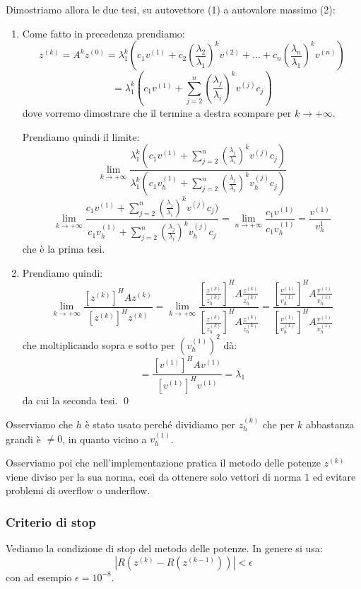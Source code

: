 \documentclass[a4paper,11pt]{article}
\begin{document}
Dimostriamo allora le due tesi, su autovettore (1) a autovalore massimo (2):
\begin{enumerate}
	\item 
Come fatto in precedenza prendiamo: 
$$
z^{(k)} = A^k z^{(0)} = \lambda_1^k \left( c_1 v^{(1)} + c_2 \left( \frac{\lambda_2}{\lambda_1} \right)^k v^{(2)} + ... + c_n \left( \frac{\lambda_n}{\lambda_1} \right)^k v^{(n)} \right)
$$
$$
= \lambda_1^k \left( c_1 v^{(1)} + \sum_{j = 2}^n \left(\frac{\lambda_j}{\lambda_i}\right)^k v^{(j)} c_j \right)
$$
dove vorremo dimostrare che il termine a destra scompare per $k \rightarrow +\infty$.

Prendiamo quindi il limite:
$$
\lim_{k \rightarrow +\infty} \frac{ \lambda_1^k \left( c_1 v^{(1)} + \sum_{j = 2}^n \left(\frac{\lambda_j}{\lambda_i}\right)^k v^{(j)} c_j \right) }{ \lambda_1^k \left( c_1 v^{(1)}_h + \sum_{j = 2}^n \left(\frac{\lambda_j}{\lambda_i}\right)^k v^{(j)}_h c_j \right) }
$$
$$
\lim_{k \rightarrow +\infty} \frac{ c_1 v^{(1)} + \sum_{j = 2}^n \left(\frac{\lambda_j}{\lambda_i}\right)^k v^{(j)} c_j ) }{ c_1 v^{(1)}_h + \sum_{j = 2}^n \left(\frac{\lambda_j}{\lambda_i}\right)^k v^{(j)}_h c_j }
= \lim_{n \rightarrow + \infty} \frac{c_1 v^{(1)}}{c_1 v_h^{(1)}} = \frac{v^{(1)}}{v_h^{1}}
$$
che è la prima tesi.

	\item
Prendiamo quindi:
$$
\lim_{k \rightarrow + \infty} \frac{\left[ z^{(k)} \right]^H A z^{(k)}}{\left[ z^{(k)} \right]^H z^{(k)}} 
= \lim_{k \rightarrow + \infty} \frac{ \left[ \frac{z^{(k)}}{z_h^{(k)}} \right]^H A \frac{z^{(k)}}{z_h^{(k)}} }{ \left[ \frac{z^{(k)}}{z^{(k)}_h} \right]^H A \frac{z^{(k)}}{z^{(k)}_h} }
= \frac{ \left[ \frac{v^{(1)}}{v_h^{(1)}} \right]^H A \frac{v^{(1)}}{v_h^{(1)}} }{ \left[ \frac{v^{(1)}}{v^{(1)}_h} \right]^H A \frac{v^{(1)}}{v^{(1)}_h} } 
$$
che moltiplicando sopra e sotto per $\left( v_h^{(1)} \right)^2$ dà:
$$
= \frac{ [v^{(1)} ]^H A v^{(1)} }{ [v^{(1)}]^H v^{(1)} } = \lambda_1
$$
da cui la seconda tesi. \qed
\end{enumerate}

Osserviamo che $h$ è stato usato perché dividiamo per $z_h^{(k)}$ che per $k$ abbastanza grandi è $\neq 0$, in quanto vicino a $v_h^{(1)}$.

Osserviamo poi che nell'implementazione pratica il metodo delle potenze $z^{(k)}$ viene diviso per la sua norma, così da ottenere solo vettori di norma $1$ ed evitare problemi di overflow o underflow.

\subsubsection{Criterio di stop}
Vediamo la condizione di stop del metodo delle potenze.
In genere si usa:
$$
|R(z^{(k)} - R(z^{(k - 1)}))| < \epsilon
$$
con ad esempio $\epsilon = 10^{-8}$.
\end{document}
